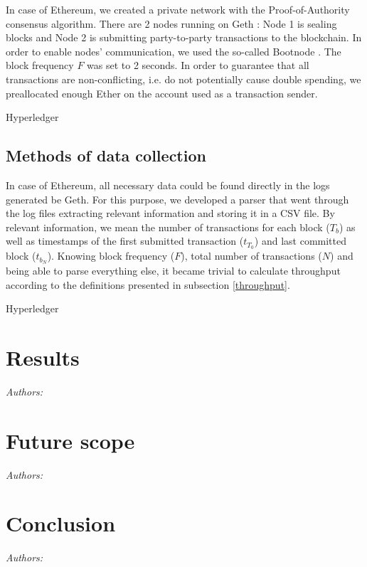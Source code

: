 \documentclass[12pt]{article}
\begin{document}
In case of Ethereum, we created a private network with the Proof-of-Authority consensus algorithm. There are 2 nodes running on Geth \cite{geth}: Node 1 is sealing blocks and Node 2 is submitting party-to-party transactions to the blockchain. In order to enable nodes’ communication, we used the so-called Bootnode \cite{bootnode}. The block frequency $F$ was set to 2 seconds. In order to guarantee that all transactions are non-conflicting, i.e. do not potentially cause double spending, we preallocated enough Ether on the account used as a transaction sender.

{\color{red} Hyperledger}



\subsection{Methods of data collection}
In case of Ethereum, all necessary data could be found directly in the logs generated be Geth. For this purpose, we developed a parser that went through the log files extracting relevant information and storing it in a CSV file. By relevant information, we mean the number of transactions for each block ($T_b$) as well as timestamps of the first submitted transaction ($t_{T_0}$) and last committed block ($t_{b_N}$). Knowing block frequency ($F$), total number of transactions ($N$) and being able to parse everything else, it became trivial to calculate throughput according to the definitions presented in subsection \ref{throughput}.

{\color{red} Hyperledger}



\section{Results}
\textit{Authors:}

\section{Future scope}
\textit{Authors:}

\section{Conclusion}
\textit{Authors:}


\newpage


\end{document}

